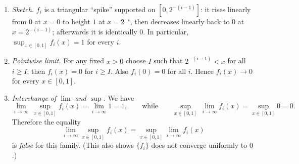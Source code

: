 \documentclass[11pt,a4paper]{article}
\begin{document}
\begin{enumerate}
\renewcommand\labelenumi{(\alph{enumi})}
\item \textit{Sketch.} $f_i$ is a triangular ``spike'' supported on $[0,2^{-(i-1)}]$: it rises linearly
from $0$ at $x=0$ to height $1$ at $x=2^{-i}$, then decreases linearly back to $0$ at $x=2^{-(i-1)}$; afterwards it is identically $0$.
In particular, $\displaystyle \sup_{x\in[0,1]} f_i(x)=1$ for every $i$.

\item \textit{Pointwise limit.} For any fixed $x>0$ choose $I$ such that $2^{-(i-1)}<x$ for all $i\ge I$; then $f_i(x)=0$ for $i\ge I$.
Also $f_i(0)=0$ for all $i$. Hence $f_i(x)\to 0$ for every $x\in[0,1]$.

\item \textit{Interchange of $\lim$ and $\sup$.} We have
\[
\lim_{i\to\infty}\ \sup_{x\in[0,1]} f_i(x)
= \lim_{i\to\infty} 1 = 1,
\qquad\text{while}\qquad
\sup_{x\in[0,1]} \ \lim_{i\to\infty} f_i(x) = \sup_{x\in[0,1]} 0 = 0.
\]
Therefore the equality
\[
\lim_{i\to\infty} \sup_{x\in[0,1]} f_i(x) = \sup_{x\in[0,1]} \lim_{i\to\infty} f_i(x)
\]
is \emph{false} for this family. (This also shows $\{f_i\}$ does not converge uniformly to $0$.)
\end{enumerate}
\end{document}
